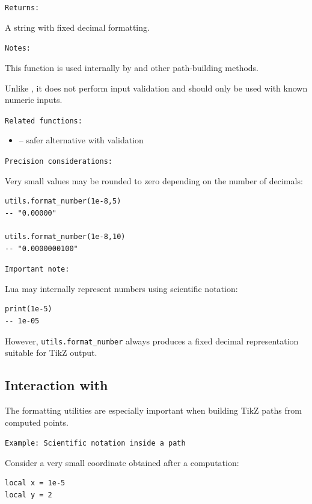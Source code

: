 \medskip
\texttt{Returns: }

A string with fixed decimal formatting.

\medskip
\texttt{Notes: }

This function is used internally by  and other path-building methods.

Unlike , it does not perform input validation and should only be used with known numeric inputs.

\medskip
\texttt{Related functions: }

\begin{itemize}
\item {} – safer alternative with validation
\end{itemize}

\medskip
\texttt{Precision considerations: }

Very small values may be rounded to zero depending on the number of decimals:

\begin{verbatim}
utils.format_number(1e-8,5)
-- "0.00000"

utils.format_number(1e-8,10)
-- "0.0000000100"
\end{verbatim}

\texttt{Important note: }

Lua may internally represent numbers using scientific notation:

\begin{verbatim}
print(1e-5)
-- 1e-05
\end{verbatim}

However, \verb|utils.format_number| always produces a fixed decimal
representation suitable for TikZ output.

\subsection{Interaction with }

The formatting utilities are especially important when building
TikZ paths from computed points.

\texttt{Example: Scientific notation inside a path}

Consider a very small coordinate obtained after a computation:

\begin{verbatim}
local x = 1e-5
local y = 2
\end{verbatim}

